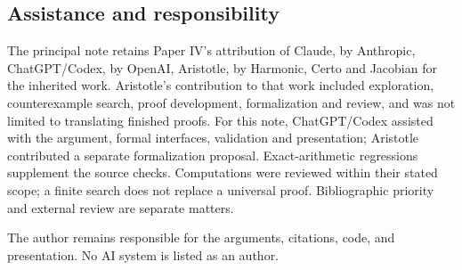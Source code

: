 \documentclass[english,11pt,a4paper]{article}
\begin{document}
\subsection{Assistance and
responsibility}\label{assistance-and-responsibility}

The principal note retains Paper IV's attribution of Claude, by
Anthropic, ChatGPT/Codex, by OpenAI, Aristotle, by Harmonic, Certo and
Jacobian for the inherited work. Aristotle's contribution to that work
included exploration, counterexample search, proof development,
formalization and review, and was not limited to translating finished
proofs. For this note, ChatGPT/Codex assisted with the argument, formal
interfaces, validation and presentation; Aristotle contributed a
separate formalization proposal. Exact-arithmetic regressions supplement
the source checks. Computations were reviewed within their stated scope;
a finite search does not replace a universal proof. Bibliographic
priority and external review are separate matters.

The author remains responsible for the arguments, citations, code, and
presentation. No AI system is listed as an author.
\end{document}
